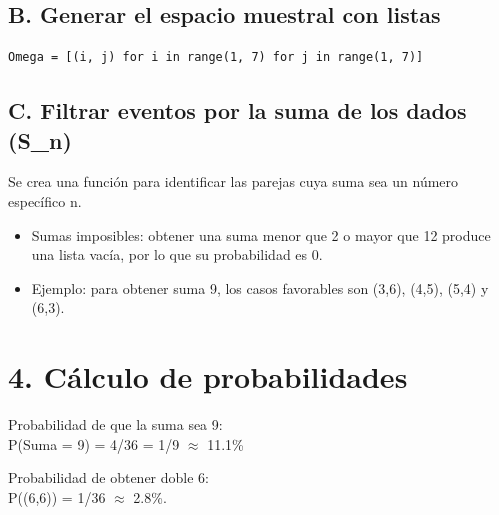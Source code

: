 \documentclass[10pt]{article}
\begin{document}
\subsection*{B. Generar el espacio muestral con listas}
\begin{verbatim}
Omega = [(i, j) for i in range(1, 7) for j in range(1, 7)]
\end{verbatim}
\subsection*{C. Filtrar eventos por la suma de los dados (S\_n)}
Se crea una función para identificar las parejas cuya suma sea un número específico n.

\begin{itemize}
\item Sumas imposibles: obtener una suma menor que 2 o mayor que 12 produce una lista vacía, por lo que su probabilidad es 0.
\item Ejemplo: para obtener suma 9, los casos favorables son (3,6), (4,5), (5,4) y (6,3).
\end{itemize}
\section*{4. Cálculo de probabilidades}
Probabilidad de que la suma sea 9:\\P(Suma = 9) = 4/36 = 1/9 $\approx$ 11.1\%

Probabilidad de obtener doble 6:\\P((6,6)) = 1/36 $\approx$ 2.8\%.
\end{document}

